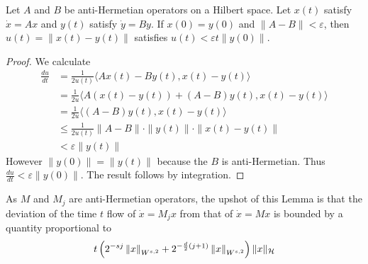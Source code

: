\begin{lemma}
Let $A$ and $B$ be anti-Hermetian operators on a Hilbert space.  Let $x(t)$ satisfy $\dot{x} = Ax$ and $y(t)$ satisfy $\dot{y} = By$.  If $x(0) = y(0)$ and $\| A - B \| < \varepsilon$, then $u(t) = \| x(t) - y(t) \|$ satisfies $u(t) < \varepsilon t  \| y(0) \|$.
\end{lemma}

\begin{proof}
	We calculate
	\begin{align*}
		\frac{du}{dt} &= \frac{1}{2u(t)} \langle Ax(t) - By(t) , x(t) - y(t) \rangle \\
			&= \frac{1}{2u} \langle A(x(t)-y(t)) + (A-B) y(t) , x(t) - y(t) \rangle \\
			&= \frac{1}{2u} \langle (A-B)y(t) , x(t) - y(t) \rangle \\
			&\leq \frac{1}{2u(t)} \| A - B \| \cdot \| y(t) \| \cdot \| x(t) - y(t) \| \\
			&< \varepsilon \| y(t) \|
	\end{align*}
	However $\| y(0) \| = \| y(t)\|$ because the $B$ is anti-Hermetian.  Thus $\frac{du}{dt} < \varepsilon \| y(0)\|$.	The result follows by integration.
\end{proof}
As $M$ and $M_j$ are anti-Hermetian operators, the upshot of this Lemma is that the deviation of the time $t$ flow of $\dot{x} = M_j x$ from that of $\dot{x} = Mx$ is bounded by a quantity proportional to
\[
 	t \left( 2^{-sj}\left\| x \right\|_{W^{s,2}} + 2^{-\frac{d}{2}(j+1)}\left\| x \right\|_{W^{s,2}} \right) \| x \|_{\mathcal{H}}
\]

